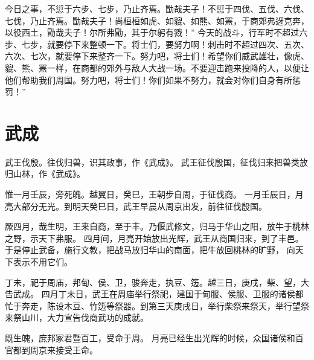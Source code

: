 \documentclass[12pt,UTF8]{ctexbook}
\begin{document}
今日之事，不愆于六步、七步，乃止齐焉。勖哉夫子！不愆于四伐、五伐、六伐、七伐，乃止齐焉。勖哉夫子！尚桓桓如虎、如貔、如熊、如罴，于商郊弗迓克奔，以役西土，勖哉夫子！尔所弗勖，其于尔躬有戮！”
今天的战斗，行军时不超过六步、七步，就要停下来整顿一下。将士们，要努力啊！刺击时不超过四次、五次、六次、七次，就要停下来整齐一下。努力吧，将士们！希望你们威武雄壮，像虎、貔、熊、罴一样，在商都的郊外与敌人大战一场。不要迎击跑来投降的人，以便让他们帮助我们周国。努力吧，将士们！你们如果不努力，就会对你们自身有所惩罚！”

\chapter{武成}

武王伐殷。往伐归兽，识其政事，作《武成》。
武王征伐殷国，征伐归来把兽类放归山林，作《武成》。

惟一月壬辰，旁死魄。越翼日，癸巳，王朝步自周，于征伐商。
一月壬辰日，月亮大部分无光。到明天癸巳日，武王早晨从周京出发，前往征伐殷国。

厥四月，哉生明，王来自商，至于丰。乃偃武修文，归马于华山之阳，放牛于桃林之野，示天下弗服。
四月间，月亮开始放出光辉，武王从商国归来，到了丰邑。于是停止武备，施行文教，把战马放归华山的南面，把牛放回桃林的旷野， 向天下表示不用它们。

丁未，祀于周庙，邦甸、侯、卫，骏奔走，执豆、笾。越三日，庚戌，柴、望，大告武成。
四月丁未日，武王在周庙举行祭祀，建国于甸服、侯服、卫服的诸侯都忙于奔走，陈设木豆、竹笾等祭器。到第三天庚戌日，举行柴祭来祭天，举行望祭来祭山川，大力宣告伐商武功的成就。

既生魄，庶邦冢君暨百工，受命于周。
月亮已经生出光辉的时候，众国诸侯和百官都到周京来接受王命。
\end{document}
